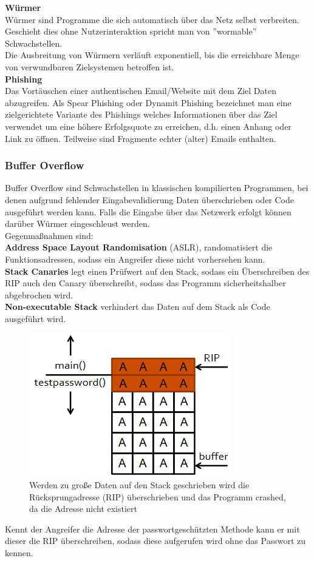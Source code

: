 \documentclass[a4paper,12pt,leqno]{article}
\begin{document}
\textbf{Würmer}\\
Würmer sind Programme die sich automatisch über das Netz selbst verbreiten. Geschieht dies ohne Nutzerinteraktion spricht man von ''wormable'' Schwachstellen.\\
Die Ausbreitung von Würmern verläuft exponentiell, bis die erreichbare Menge von verwundbaren Zielsystemen betroffen ist.\\

\textbf{Phishing}\\
Das Vortäuschen einer authentischen Email/Website mit dem Ziel Daten abzugreifen.
Als Spear Phishing oder Dynamit Phishing bezeichnet man eine zielgerichtete Variante des Phishings welches Informationen über das Ziel verwendet um eine höhere Erfolgsquote zu erreichen, d.h. einen Anhang oder Link zu öffnen. Teilweise sind Fragmente echter (alter) Emails enthalten.

\subsubsection{Buffer Overflow}

Buffer Overflow sind Schwachstellen in klassischen kompilierten Programmen, bei denen aufgrund fehlender Eingabevalidierung Daten überschrieben oder Code ausgeführt werden kann.
Falls die Eingabe über das Netzwerk erfolgt können darüber Würmer eingeschleust werden.\\

Gegenmaßnahmen sind:\\
\textbf{Address Space Layout Randomisation} (ASLR), randomatisiert die Funktionsadressen, sodass ein Angreifer diese nicht vorhersehen kann.\\
\textbf{Stack Canaries} legt einen Prüfwert auf den Stack, sodass ein Überschreiben des RIP auch den Canary überschreibt, sodass das Programm sicherheitshalber abgebrochen wird.\\
\textbf{Non-executable Stack} verhindert das Daten auf dem Stack als Code ausgeführt wird.\\

\begin{figure}[h!]
\centering
\includegraphics[scale=0.8]{Grafiken/StackSmashing.png}
\caption{Werden zu große Daten auf den Stack geschrieben wird die Rücksprungadresse (RIP) überschrieben und das Programm crashed, da die Adresse nicht existiert}
\end{figure}
Kennt der Angreifer die Adresse der passwortgeschützten Methode kann er mit dieser die RIP überschreiben, sodass diese aufgerufen wird ohne das Passwort zu kennen.
\end{document}
